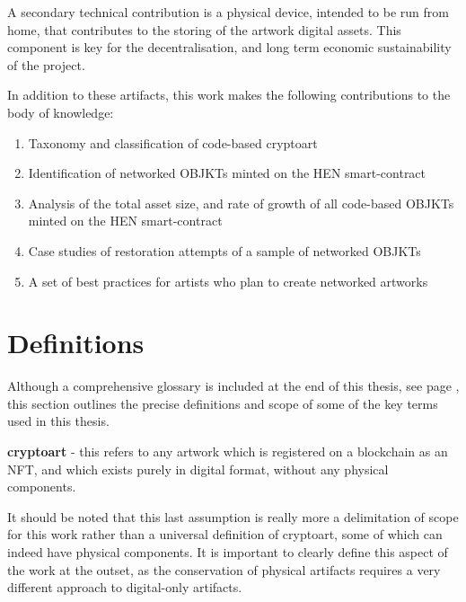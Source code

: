 \vspace{0.5cm}

A secondary technical contribution is a physical device, intended to be run from home, that contributes to the storing of the artwork digital assets. This component is key for the decentralisation, and long term economic sustainability of the project. 

\vspace{0.5cm}

In addition to these artifacts, this work makes the following contributions to the body of knowledge:

\begin{enumerate}
    \item Taxonomy and classification of code-based cryptoart
    \item Identification of networked OBJKTs minted on the HEN smart-contract
    \item Analysis of the total asset size, and rate of growth of all code-based OBJKTs minted on the HEN smart-contract
    \item Case studies of restoration attempts of a sample of networked OBJKTs
    \item A set of best practices for artists who plan to create networked artworks
\end{enumerate}


\section{Definitions}
\label{sec:definitions}

Although a comprehensive glossary is included at the end of this thesis, see page \pageref{sec:glossary}, this section outlines the precise definitions and scope of some of the key terms used in this thesis.

\vspace{0.5cm}

\textbf{cryptoart} - this refers to any artwork which is registered on a blockchain as an NFT, and which exists purely in digital format, without any physical components.

It should be noted that this last assumption is really more a delimitation of scope for this work rather than a universal definition of cryptoart, some of which can indeed have physical components. It is important to clearly define this aspect of the work at the outset, as the conservation of physical artifacts requires a very different approach to digital-only artifacts.

